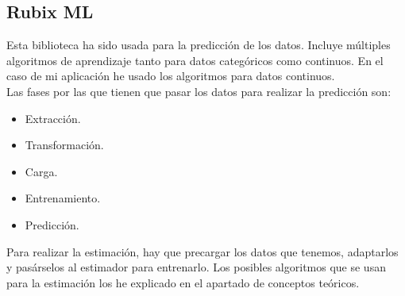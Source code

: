 \subsection{Rubix ML}
Esta biblioteca ha sido usada para la predicción de los datos. Incluye múltiples algoritmos de aprendizaje tanto para datos categóricos como continuos. En el caso de mi aplicación he usado los algoritmos para datos continuos.\\
Las fases por las que tienen que pasar los datos para realizar la predicción son:
\begin{itemize}
    \item Extracción.
    \item Transformación.
    \item Carga.
    \item Entrenamiento.
    \item Predicción.
\end{itemize}
Para realizar la estimación, hay que precargar los datos que tenemos, adaptarlos y pasárselos al estimador para entrenarlo. Los posibles algoritmos que se usan para la estimación los he explicado en el apartado de conceptos teóricos.
